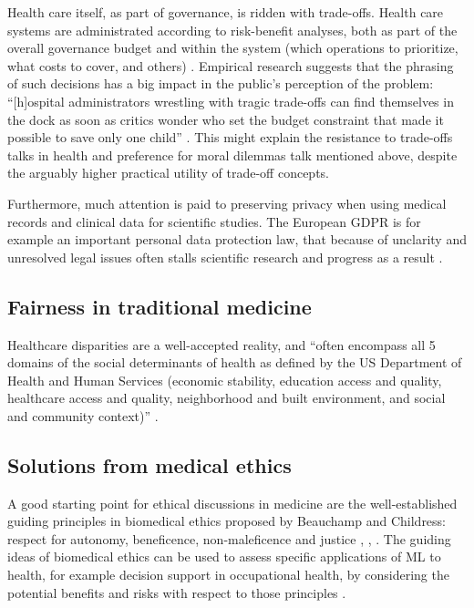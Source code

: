     Health care itself, as part of governance, is ridden with trade-offs.
    Health care systems are administrated according to risk-benefit analyses, both as part of the overall governance budget and within the system (which operations to prioritize, what costs to cover, and others) \cite{Dionne2018}.
    Empirical research suggests that the phrasing of such decisions has a big impact in the public's perception of the problem:
    ``[h]ospital administrators wrestling with tragic trade-offs can find themselves in the dock as soon as critics wonder who set the budget constraint that made it possible to save only one child'' \cite[p.~323]{Tetlock2003}.
    This might explain the resistance to trade-offs talks in health and preference for moral dilemmas talk mentioned above, despite the arguably higher practical utility of trade-off concepts.

    Furthermore, much attention is paid to preserving privacy when using medical records and clinical data for scientific studies.
    The European GDPR is for example an important personal data protection law, that because of unclarity and unresolved legal issues often stalls scientific research and progress as a result \cite{Eiss2020}.


\subsection{Fairness in traditional medicine}
    Healthcare disparities are a well-accepted reality, and ``often encompass all 5 domains of the social determinants of health as defined by the US Department of Health and Human Services (economic stability, education access and quality, healthcare access and quality, neighborhood and built environment, and social and community context)'' \cite[p.~2]{Chen2021}.


\subsection{Solutions from medical ethics}
    A good starting point for ethical discussions in medicine are the well-established guiding principles in biomedical ethics proposed by Beauchamp and Childress: respect for autonomy, beneficence, non-maleficence and justice \cite[pp.~344-345]{Dijkstra2020}, \cite[p.~2]{Morley2020}, \cite[p.~2]{Rajkomar2018}.
    The guiding ideas of biomedical ethics can be used to assess specific applications of ML to health, for example decision support in occupational health, by considering the potential benefits and risks with respect to those principles \cite{Dijkstra2020}.

